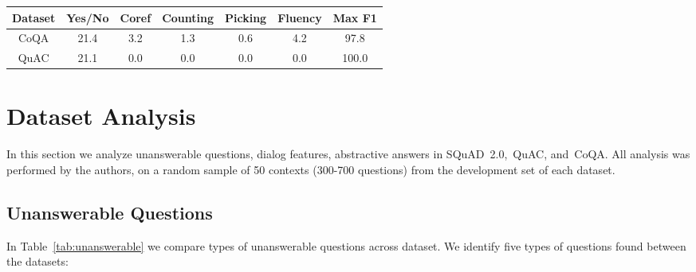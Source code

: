 \documentclass[11pt,a4paper]{article}
\newcommand{\quact}[0]{QuAC}
\newcommand{\coqa}[0]{CoQA}
\newcommand{\squad}[0]{SQuAD~2.0}
\begin{document}
\begin{table*}[t]
 \small
 \centering
\begin{tabular}
{c|c|c|c|c|c|c}

\multirow{1}{*}{Dataset}& 
\multirow{1}{*}{\parbox{1cm}{\centering Yes/No}} 
& \multirow{1}{*}{\parbox{1cm}{\centering Coref }} 
& \multirow{1}{*}{\parbox{1.8 cm}{\centering Counting}} 
& \multirow{1}{*}{\parbox{1.7cm}{\centering Picking }} &
\multirow{1}{*}{\parbox{1.7cm}{\centering Fluency }} &
\multirow{1}{*}{\parbox{1.7cm}{\centering Max F1 }} 
\\
\midrule
\coqa & 21.4 & 3.2 & 1.3 & 0.6 & 4.2 & 97.8  \\ 
\quact  & 21.1 & 0.0 & 0.0 & 0.0 & 0.0 & 100.0 \\
 
\end{tabular}
     \vspace{-5pt}

\caption{Comparison of abstractive features in 50 random contexts in the develoment set of each dataset. Both \quact~and \coqa~contain yes/no questions while \coqa~also contains answers that improve fluency through abstractive behavior. The extractive upper bound from \coqa~is high because most absractivive answers involve adding a pronoun (Coref) or inserting prepositions and changing word forms (Fluency) to existing extractive answers, resulting in extremely high overlap with possible extractive answers.} 
 \label{tab:abstractive}
     \vspace{-7pt}

\end{table*}


\section{Dataset Analysis}
\label{sec:data_analysis}
In this section we analyze unanswerable questions, dialog features, abstractive answers in \squad,~\quact, and~\coqa. 
All analysis was performed by the authors, on a random sample of 50 contexts (300-700 questions) from the development set of each dataset. 


 \vspace{-5pt}
\subsection{Unanswerable Questions}
\label{sec:unanswerable}
In Table~\ref{tab:unanswerable} we compare types of unanswerable questions across dataset.
We identify five types of questions found between the datasets:
\vspace{-7pt}
\end{document}
